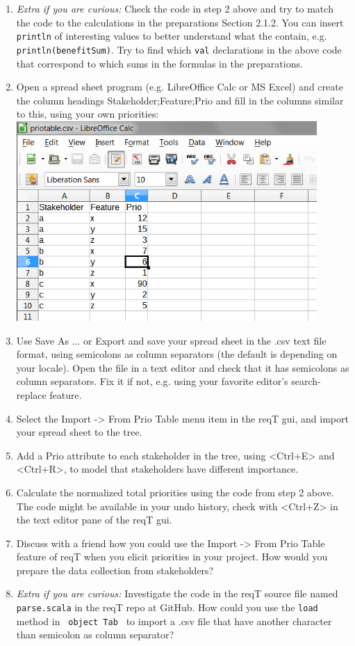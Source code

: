 \documentclass[11pt]{article}
\begin{document}
\begin{framed}
\begin{enumerate}
\item {\it Extra if you are curious:} Check the code in step 2 above and try to match the code to the calculations in the preparations Section 2.1.2. You can insert \verb+println+ of interesting values to better understand what the contain, e.g. \verb+println(benefitSum)+. Try to find which {\verb+val+} declarations in the above code that correspond to which sums in the formulas in the preparations. 
\item Open a spread sheet program (e.g. LibreOffice Calc or MS Excel) and create the column headings Stakeholder;Feature;Prio and fill in the columns similar to this, using your own priorities:
\includegraphics[width=0.9\textwidth]{spread-sheet.png}
\item Use Save As ... or Export and save your spread sheet in the .csv text file format, using semicolons as column separators (the default is depending on your locale). Open the file in a text editor and check that it has semicolons as column separators. Fix it if not, e.g. using your favorite editor's search-replace feature.
\item Select the Import -> From Prio Table menu item in the reqT gui, and import your spread sheet to the tree.
\item Add a Prio attribute to each stakeholder in the tree, using <Ctrl+E> and <Ctrl+R>, to model that stakeholders have different importance.
\item Calculate the normalized total priorities using the code from step 2 above. The code might be available in your undo history, check with <Ctrl+Z> in the text editor pane of the reqT gui.
\item Discuss with a friend how you could use the Import -> From Prio Table feature of reqT when you elicit priorities in your project. How would you prepare the data collection from stakeholders?
\item {\it Extra if you are curious:} Investigate the code in the reqT source file named \verb+parse.scala+ in the reqT repo at GitHub. How could you use the \verb+load+ method in \verb+ object Tab + to import a .csv file that have another character than semicolon as column separator? 
\end{enumerate}

\end{framed}
\end{document}
